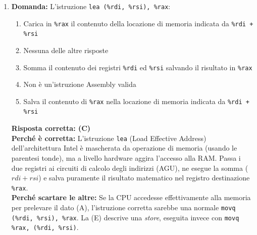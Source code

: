 \documentclass[12pt, a4paper]{article}
\begin{document}
\begin{enumerate}
    \item \textbf{Domanda:} L'istruzione \texttt{lea (\%rdi, \%rsi), \%rax}:
    \begin{enumerate}[label=(\Alph*)]
        \item Carica in \texttt{\%rax} il contenuto della locazione di memoria indicata da \texttt{\%rdi + \%rsi}
        \item Nessuna delle altre risposte
        \item Somma il contenuto dei registri \texttt{\%rdi} ed \texttt{\%rsi} salvando il risultato in \texttt{\%rax}
        \item Non è un'istruzione Assembly valida
        \item Salva il contenuto di \texttt{\%rax} nella locazione di memoria indicata da \texttt{\%rdi + \%rsi}
    \end{enumerate}

\newpage
    
    \textbf{Risposta corretta: (C)} \\
    \textbf{Perché è corretta:} L'istruzione \texttt{lea} (Load Effective Address) dell'architettura Intel è mascherata da operazione di memoria (usando le parentesi tonde), ma a livello hardware aggira l'accesso alla RAM. Passa i due registri ai circuiti di calcolo degli indirizzi (AGU), ne esegue la somma ($rdi + rsi$) e salva puramente il risultato matematico nel registro destinazione \texttt{\%rax}. \\
    \textbf{Perché scartare le altre:} Se la CPU accedesse effettivamente alla memoria per prelevare il dato (A), l'istruzione corretta sarebbe una normale \texttt{movq (\%rdi, \%rsi), \%rax}. La (E) descrive una \textit{store}, eseguita invece con \texttt{movq \%rax, (\%rdi, \%rsi)}.


\end{enumerate}
\end{document}
